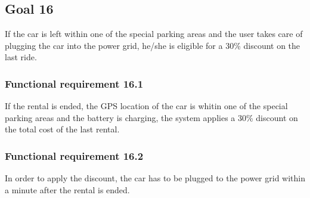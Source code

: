 \subsection{Goal 16}
If the car is left within one of the special parking areas and the user takes care of plugging the car into the power grid, he/she is eligible for a 30\% discount on the last ride.

\setcounter{secnumdepth}{3}
\subsubsection{Functional requirement 16.1}
If the rental is ended, the GPS location of the car is whitin one of the special parking areas and the battery is charging, the system applies a 30\% discount on the total cost of the last rental.

\subsubsection{Functional requirement 16.2}
In order to apply the discount, the car has to be plugged to the power grid within a minute after the rental is ended.
